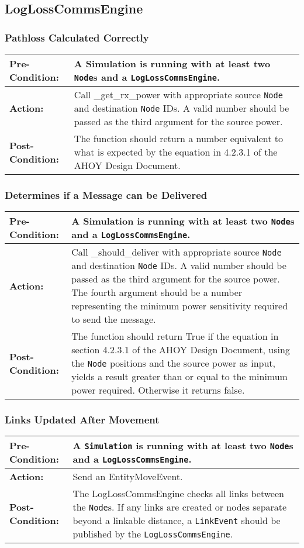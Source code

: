 \documentclass[titlepage]{article}
\newcommand{\testcase}[3]{
    \begin{center}
    \begin{tabular}{| l | p{0.7\textwidth}|}
        \hline
        \rowcolor[gray]{0.8}\textbf{Pre-Condition:} & #1 \\ \hline
        \textbf{Action:} & #2 \\ \hline
        \rowcolor[gray]{0.8}\textbf{Post-Condition:} & #3 \\ \hline
    \end{tabular}
    \end{center}
}
\begin{document}

\subsection{LogLossCommsEngine}
\subsubsection{Pathloss Calculated Correctly}
\testcase{A Simulation is running with at least two \texttt{Node}s and a \texttt{LogLossCommsEngine}. }{Call \_get\_rx\_power with appropriate source \texttt{Node} and destination \texttt{Node} IDs. A valid number should be passed as the third argument for the source power. }{The function should return a number equivalent to what is expected by the equation in 4.2.3.1 of the AHOY Design Document.}

\subsubsection{Determines if a Message can be Delivered}
\testcase{A Simulation is running with at least two \texttt{Node}s and a \texttt{LogLossCommsEngine}. }{Call
\_should\_deliver with appropriate source \texttt{Node} and destination \texttt{Node} IDs. A valid number should be
passed as the third argument for the source power.  The fourth argument should be a number representing the minimum
power sensitivity required to send the message. }{The function should return True if the equation in section 4.2.3.1 of
the AHOY Design Document, using the \texttt{Node} positions and the source power as input, yields a result greater than
or equal to the minimum power required. Otherwise it returns false.}

\subsubsection{Links Updated After Movement}
\testcase{A \texttt{Simulation} is running with at least two \texttt{Node}s and a \texttt{LogLossCommsEngine}.}{Send an
EntityMoveEvent.}{The LogLossCommsEngine checks all links between the \texttt{Node}s.  If any links are created or nodes
separate beyond a linkable distance, a \texttt{LinkEvent} should be published by the \texttt{LogLossCommsEngine}.}
\end{document}
